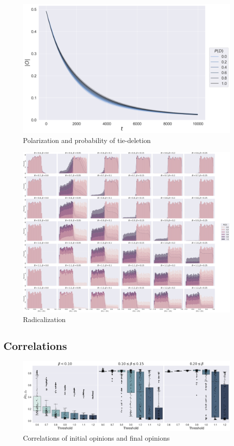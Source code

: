 \documentclass{article}
\begin{document}
\begin{figure}[H]
    \centering
    \includegraphics[width=.8\linewidth]{../plots/overall/Absolute_Opinion_Tie_Deletion_Without_Negative.png}
  \caption{Polarization and probability of tie-deletion}
  \label{fig:sfig1}
\end{figure}

\begin{figure}[H]
    \centering
    \includegraphics[width=.8\linewidth]{../plots/overall/Radicalization.png}
  \caption{Radicalization}
  \label{fig:sfig1}
\end{figure}

\subsection{Correlations}

\begin{figure}[H]
    \centering
    \includegraphics[width=.8\linewidth]{../plots/overall/Correlation_Initial_Opinions.png}
  \caption{Correlations of initial opinions and final opinions}
  \label{fig:sfig1}
\end{figure}
\end{document}
